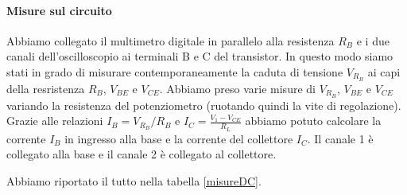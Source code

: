\documentclass[10pt,a4paper]{article}
\begin{document}
\paragraph{Misure sul circuito}
Abbiamo collegato il multimetro digitale in parallelo alla resistenza $R_B$  e i due canali dell'oscilloscopio ai terminali B e C del transistor. In questo modo siamo stati in grado di misurare contemporaneamente la caduta di tensione $V_{R_B}$ ai capi della resristenza $R_B$, $V_{BE}$ e $V_{CE}$.
Abbiamo preso varie misure di $V_{R_B}$, $V_{BE}$ e $V_{CE}$  variando la resistenza del potenziometro (ruotando quindi la vite di regolazione). Grazie alle relazioni $I_B=V_{R_B}/R_B$ e $I_C=\frac{V_1-V_{CE}}{R_L}$ abbiamo potuto calcolare la corrente $I_B$ in ingresso alla base e la corrente del collettore $I_C$.
Il canale 1 è collegato alla base e il canale 2 è collegato al collettore.

Abbiamo riportato il tutto nella tabella \ref{misureDC}.
\end{document}
